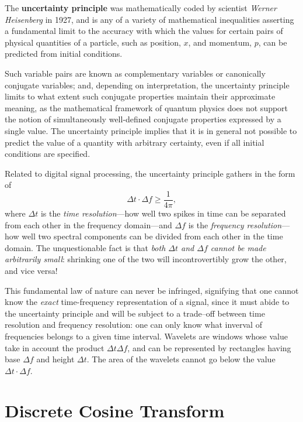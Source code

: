 \documentclass[\documentfontsize, twocolumn]{\classname}
\begin{document}
The \textbf{uncertainty principle} was mathematically coded by scientist \emph{Werner Heisenberg} in 1927, and is any of a variety of mathematical inequalities asserting a fundamental limit to the accuracy with which the values for certain pairs of physical quantities of a particle, such as position, $x$, and momentum, $p$, can be predicted from initial conditions\cite{bib:wernerHeisemberg}.

Such variable pairs are known as complementary variables or canonically conjugate variables; and, depending on interpretation, the uncertainty principle limits to what extent such conjugate properties maintain their approximate meaning, as the mathematical framework of quantum physics does not support the notion of simultaneously well-defined conjugate properties expressed by a single value. The uncertainty principle implies that it is in general not possible to predict the value of a quantity with arbitrary certainty, even if all initial conditions are specified\cite{bib:wernerHeisemberg}.

Related to digital signal processing, the uncertainty principle gathers in the
form of
\begin{equation}\label{eqn:uncertaintyPrinciple}
    \Delta t \cdot \Delta f \geq \frac 1 {4\pi},
\end{equation}
where $\Delta t$ is the \emph{time resolution}---how well two spikes in time can be separated from each other in the frequency domain---and $\Delta f$ is the \emph{frequency resolution}---how well two spectral components can be divided from each other in the time domain. The unquestionable fact is that \emph{both $\Delta t$ and $\Delta f$ cannot be made arbitrarily small}: shrinking one of the two will incontrovertibly grow the other, and vice versa!

This fundamental law of nature can never be infringed, signifying that one cannot know the \emph{exact} time-frequency representation of a signal, since it must abide to the uncertainty principle and will be subject to a trade--off between time resolution and frequency resolution: one can only know what inverval of frequencies belongs to a given time interval. Wavelets are windows whose value take in account the product $\Delta t \Delta f$, and can be represented by rectangles having base $\Delta f$ and height $\Delta t$. The area of the wavelets cannot go below the value $\Delta t \cdot \Delta f$.

\section{Discrete Cosine Transform}\label{sec:discreteCosineTransform}
\end{document}
